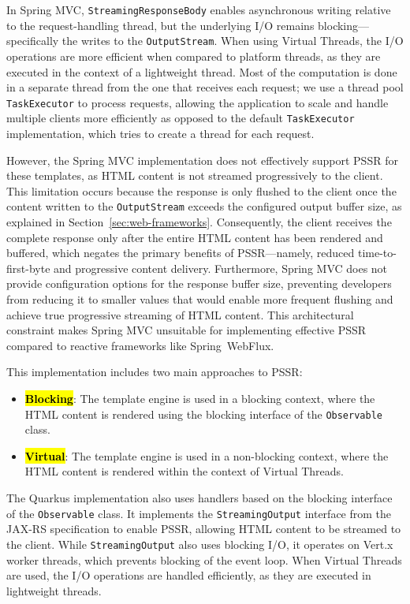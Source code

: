 \documentclass[software,article,accept,pdftex,moreauthors]{Definitions/mdpi}
\begin{document}
In Spring MVC, \texttt{StreamingResponseBody} enables asynchronous writing
relative to the request-handling thread, but the underlying I/O remains
blocking---specifically the writes to the \texttt{OutputStream}. When using
Virtual Threads, the I/O operations are more efficient when compared to
platform threads, as they are executed in the context of a lightweight thread.
Most of the computation is done in a separate thread from the one that receives
each request; we use a thread pool \texttt{TaskExecutor} to process requests,
allowing the application to scale and handle multiple clients more efficiently
as opposed to the default \texttt{TaskExecutor} implementation, which tries to
create a thread for each request.

However, the Spring MVC implementation does not effectively support PSSR for
these templates, as HTML content is not streamed progressively to the client.
This limitation occurs because the response is only flushed to the client once
the content written to the \texttt{OutputStream} exceeds the configured output
buffer size, as explained in Section~\ref{sec:web-frameworks}. Consequently,
the client receives the complete response only after the entire HTML content
has been rendered and buffered, which negates the primary benefits of
PSSR---namely, reduced time-to-first-byte and progressive content delivery.
Furthermore, Spring MVC does not provide configuration options for the response
buffer size, preventing developers from reducing it to smaller values that
would enable more frequent flushing and achieve true progressive streaming of
HTML content. This architectural constraint makes Spring MVC unsuitable for
implementing effective PSSR compared to reactive frameworks like Spring~WebFlux.

This implementation includes two main approaches to PSSR\@:
\begin{itemize}
      \item \textbf{\hl{Blocking}}: The template engine is used in a blocking context,
            where the HTML content is rendered using the blocking interface of the
            \texttt{Observable} class.
      \item \textbf{\hl{Virtual}}: The template engine is used in a non-blocking context,
            where the HTML content is rendered within the context of Virtual Threads.
\end{itemize}

The Quarkus implementation also uses handlers based on the blocking interface
of the \texttt{Observable} class. It implements the \texttt{StreamingOutput}
interface from the JAX-RS specification to enable PSSR, allowing HTML content
to be streamed to the client. While \texttt{StreamingOutput} also uses blocking
I/O, it operates on Vert.x worker threads, which prevents blocking of the event
loop. When Virtual Threads are used, the I/O operations are handled
efficiently, as they are executed in lightweight threads.
\end{document}
